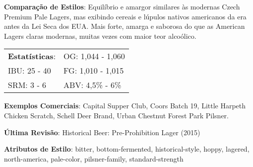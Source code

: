 \textbf{Comparação de Estilos}: Equilíbrio e amargor similares às modernas Czech Premium Pale Lagers, mas exibindo cereais e lúpulos nativos americanos da era antes da Lei Seca dos EUA. Mais forte, amarga e saborosa do que as American Lagers claras modernas, muitas vezes com maior teor alcoólico.

\begin{tabular}{@{}p{35mm}p{35mm}@{}}
  \textbf{Estatísticas}: & OG: 1,044 - 1,060  \\
  IBU: 25 - 40  & FG: 1,010 - 1,015  \\
  SRM: 3 - 6 & ABV: 4,5\% - 6\%
\end{tabular}

\textbf{Exemplos Comerciais}: Capital Supper Club, Coors Batch 19, Little Harpeth Chicken Scratch, Schell Deer Brand, Urban Chestnut Forest Park Pilsner.

\textbf{Última Revisão}: Historical Beer: Pre-Prohibition Lager (2015)

\textbf{Atributos de Estilo}: bitter, bottom-fermented, historical-style, hoppy, lagered, north-america, pale-color, pilsner-family, standard-strength
